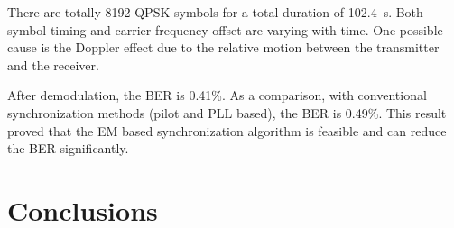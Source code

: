\documentclass[journal,comsoc]{IEEEtran}
\begin{document}
There are totally 8192 QPSK symbols for a total duration of 102.4~s.
Both symbol timing and carrier frequency offset are varying with time.
One possible cause is the Doppler effect due to the relative motion between the transmitter and the receiver.

After demodulation, the BER is 0.41\%.
As a comparison, with conventional synchronization methods (pilot and PLL based), the BER is 0.49\%.
This result proved that the EM based synchronization algorithm is feasible and can reduce the BER significantly.



\section{Conclusions}
\label{sec:conc}




\end{document}
